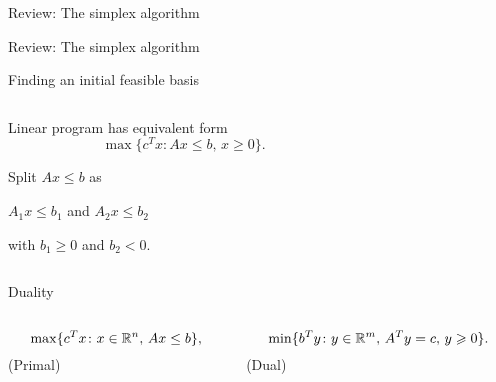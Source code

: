 \pagestyle{empty}



\begin{frame}{Review: The simplex algorithm}

 
\end{frame}


\begin{frame}{Review: The simplex algorithm}

 
\end{frame}





\begin{frame}{Finding an initial feasible basis}

  \begin{columns}
    \begin{column}{.5\textwidth}
      
Linear program has equivalent form 
\begin{equation}
  \label{eq:s-3}
  \max\{ c^Tx \colon Ax \leq b, \, x \geq 0\}. 
\end{equation}

\bigskip

Split  $Ax \leq b$ as

\medskip 
$A_1x\leq b_1$ and $A_2x\leq b_2$

\medskip 
with $b_1 \geq 0$ and $b_2<0$.
    \end{column}
    \begin{column}{.5\textwidth}
      
    \end{column}       
  \end{columns}
\end{frame}





\begin{frame}{Duality}

  \begin{columns}
    \begin{column}{.5\textwidth}
      \begin{equation*}
        \max\{c^T x \colon x \in \mathbb{R}^n, \, Ax \leq b\}, 
      \end{equation*}
      (Primal) 
    \end{column}
    \begin{column}{.5\textwidth}
      \begin{equation*}        
  \min\{b^Ty \colon y \in \mathbb{R}^m, \, A^T y = c,\, y\geqslant0\}.
\end{equation*}
(Dual)
    \end{column}       
  \end{columns}
\end{frame}





